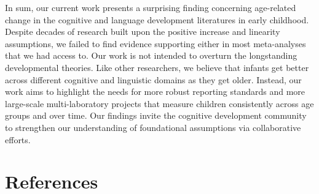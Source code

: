 \documentclass[
  man]{apa6}
\begin{document}
In sum, our current work presents a surprising finding concerning age-related change in the cognitive and language development literatures in early childhood. Despite decades of research built upon the positive increase and linearity assumptions, we failed to find evidence supporting either in most meta-analyses that we had access to. Our work is not intended to overturn the longstanding developmental theories. Like other researchers, we believe that infants get better across different cognitive and linguistic domains as they get older. Instead, our work aims to highlight the needs for more robust reporting standards and more large-scale multi-laboratory projects that measure children consistently across age groups and over time. Our findings invite the cognitive development community to strengthen our understanding of foundational assumptions via collaborative efforts.

\newpage

\hypertarget{references}{%
\section{References}\label{references}}
\end{document}

